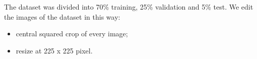 The dataset was divided into 70\% training, 25\% validation and 5\% test.
We edit the images of the dataset in this way:

\begin{itemize}
	\item central squared crop of every image;
	\item resize at 225 x 225 pixel.
\end{itemize}



